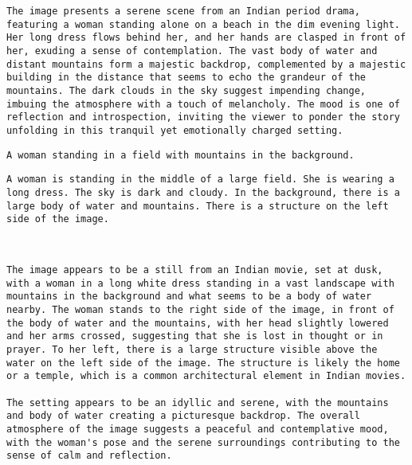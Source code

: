 \begin{lstlisting}[caption={Captions using Llama 3.2 for 8636.jpg}]
The image presents a serene scene from an Indian period drama, featuring a woman standing alone on a beach in the dim evening light. Her long dress flows behind her, and her hands are clasped in front of her, exuding a sense of contemplation. The vast body of water and distant mountains form a majestic backdrop, complemented by a majestic building in the distance that seems to echo the grandeur of the mountains. The dark clouds in the sky suggest impending change, imbuing the atmosphere with a touch of melancholy. The mood is one of reflection and introspection, inviting the viewer to ponder the story unfolding in this tranquil yet emotionally charged setting.
\end{lstlisting}


\begin{lstlisting}[caption={Captions using Phi 4 for 8636.jpg}]
A woman standing in a field with mountains in the background.
\end{lstlisting}


\begin{lstlisting}[caption={Captions using Phi 4 with SAM 2 for 8636.jpg}]
A woman is standing in the middle of a large field. She is wearing a long dress. The sky is dark and cloudy. In the background, there is a large body of water and mountains. There is a structure on the left side of the image.
\end{lstlisting}


\begin{lstlisting}[caption={Captions using Llama 3.2 with SAM 2 for 8636.jpg}]


The image appears to be a still from an Indian movie, set at dusk, with a woman in a long white dress standing in a vast landscape with mountains in the background and what seems to be a body of water nearby. The woman stands to the right side of the image, in front of the body of water and the mountains, with her head slightly lowered and her arms crossed, suggesting that she is lost in thought or in prayer. To her left, there is a large structure visible above the water on the left side of the image. The structure is likely the home or a temple, which is a common architectural element in Indian movies.

The setting appears to be an idyllic and serene, with the mountains and body of water creating a picturesque backdrop. The overall atmosphere of the image suggests a peaceful and contemplative mood, with the woman's pose and the serene surroundings contributing to the sense of calm and reflection.
\end{lstlisting}

